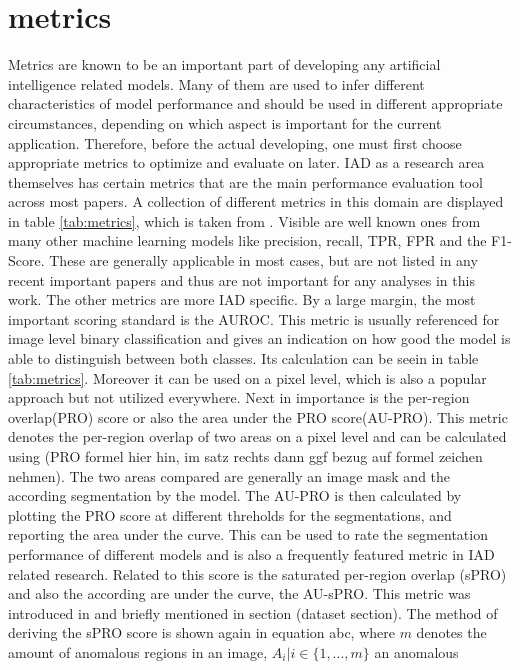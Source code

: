 \section{metrics}
Metrics are known to be an important part of developing any artificial intelligence related models. Many of them are used to infer 
different characteristics of model performance and should be used in different appropriate circumstances, depending on which aspect 
is important for the current application. Therefore, before the actual developing, one must first choose appropriate metrics 
to optimize and evaluate on later. IAD as a research area themselves has certain metrics that are the main performance evaluation tool 
across most papers. 
A collection of different metrics in this domain are displayed in table \ref{tab:metrics}, which is taken from 
\cite{liu2024deep}. Visible are well known 
ones from many other machine learning models like precision, recall, TPR, FPR and the F1-Score. These are generally applicable in most 
cases, but are not listed in any recent important papers and thus are not important for any analyses in this work. The other metrics are 
more IAD specific. By a large margin, the most important scoring standard is the AUROC. This metric is usually referenced for image level 
binary classification and gives an indication on how good the model is able to distinguish between both classes. Its calculation can be seein in 
table \ref{tab:metrics}. Moreover it can be used on a pixel level, which is also a popular approach but not utilized everywhere.
Next in importance is the per-region overlap(PRO) score or also the area under the PRO score(AU-PRO). This metric denotes the per-region overlap of two areas 
on a pixel level and can be calculated using (PRO formel hier hin, im satz rechts dann ggf bezug auf formel zeichen nehmen). The two areas 
compared are generally an image mask and the according segmentation by the model. The AU-PRO is then calculated by plotting the PRO score 
at different threholds for the segmentations, and reporting the area under the curve. This can be 
used to rate the segmentation performance of different models and is also a frequently featured metric in IAD related research. 
Related to this score is the saturated per-region overlap (sPRO) and also the according are under the curve, the AU-sPRO. This metric was 
introduced in \cite{LOCODentsAndScratchesBergmann2022} and briefly mentioned in section (dataset section). The method of deriving the sPRO 
score is shown again in equation abc, where $m$ denotes the amount of anomalous regions in an image, $A_i | i \in \{1, ... , m\}$ an anomalous 
